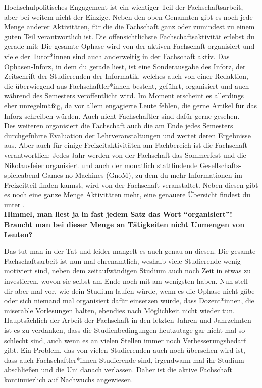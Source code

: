 {    Hochschulpolitisches Engagement ist ein wichtiger Teil der Fachschaftsarbeit, aber bei weitem nicht der Einzige. Neben den oben Genannten gibt es noch jede Menge anderer Aktivitäten, für die die Fachschaft ganz oder zumindest zu einem guten Teil verantwortlich ist. Die offensichtlichste Fachschaftsaktivität erlebst du gerade mit: Die gesamte Ophase wird von der aktiven Fachschaft organisiert und viele der Tutor*innen sind auch anderweitig in der Fachschaft aktiv. Das Ophasen-Inforz, in dem du gerade liest, ist eine Sonderausgabe des Inforz, der Zeitschrift der Studierenden der Informatik, welches auch von einer Redaktion, die überwiegend aus Fachschaftler*innen besteht, geführt, organisiert und auch während des Semesters veröffentlicht wird. Im Moment erscheint es allerdings eher unregelmäßig, da vor allem engagierte Leute fehlen, die gerne Artikel für das Inforz schreiben würden. Auch nicht-Fachschaftler sind dafür gerne gesehen.\\
    Des weiteren organisiert die Fachschaft auch die am Ende jedes Semesters durchgeführte Evaluation der Lehrveranstaltungen und wertet deren Ergebnisse aus. Aber auch für einige Freizeitaktivitäten am Fachbereich ist die Fachschaft verantwortlich: Jedes Jahr werden von der Fachschaft das Sommerfest und die Nikolausfeier organisiert und auch der monatlich stattfindende Gesellschafts-spieleabend Games no Machines (GnoM), zu dem du mehr Informationen im Freizeitteil finden kannst, wird von der Fachschaft veranstaltet. Neben diesen gibt es noch eine ganze Menge Aktivitäten mehr, eine genauere Übersicht findest du unter \footnotemark[2].\\

    \textbf{Himmel, man liest ja in fast jedem Satz das Wort "`organisiert"'! Braucht man bei dieser Menge an Tätigkeiten nicht Unmengen von Leuten?}

    Das tut man in der Tat und leider mangelt es auch genau an diesen. Die gesamte Fachschaftsarbeit ist nun mal ehrenamtlich, weshalb viele Studierende wenig motiviert sind, neben dem zeitaufwändigen Studium auch noch Zeit in etwas zu investieren, wovon sie selbst am Ende noch mit am wenigsten haben. Nun stell dir aber mal vor, wie dein Studium laufen würde, wenn es die Ophase nicht gäbe oder sich niemand mal organisiert dafür einsetzen würde, dass Dozent*innen, die miserable Vorlesungen halten, ebendies nach Möglichkeit nicht wieder tun. Hauptsächlich der Arbeit der Fachschaft in den letzten Jahren und Jahrzehnten ist es zu verdanken, dass die Studienbedingungen heutzutage gar nicht mal so schlecht sind, auch wenn es an vielen Stellen immer noch Verbesserungsbedarf gibt. Ein Problem, das von vielen Studierenden auch noch übersehen wird ist, dass auch Fachschaftler*innen Studierende sind, irgendwann mal ihr Studium abschließen und die Uni danach verlassen. Daher ist die aktive Fachschaft kontinuierlich auf Nachwuchs angewiesen.\\

}
